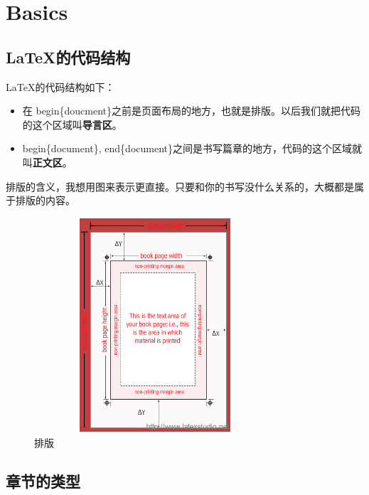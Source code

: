 
\chapter{Basics}

\pagestyle{fancy}
\fancyhf{}
\fancyhead[OC]{\leftmark}
\fancyhead[EC]{\rightmark}
\cfoot{\thepage}


\section{{LaTeX}的代码结构}

{LaTeX}的代码结构如下：

\begin{itemize}
    \item 在 begin\{doucment\}之前是页面布局的地方，也就是排版。以后我们就把代码的这个区域叫\textbf{导言区}。
    \item begin\{document\}, end\{document\}之间是书写篇章的地方，代码的这个区域就叫\textbf{正文区}。
\end{itemize}

排版的含义，我想用图来表示更直接。只要和你的书写没什么关系的，大概都是属于排版的内容。

\begin{figure}[!h]
	\includegraphics[width=0.8\textwidth, height=8cm]{figures/pagedesign.png}
	\caption{排版}
\end{figure}



\section{章节的类型}


